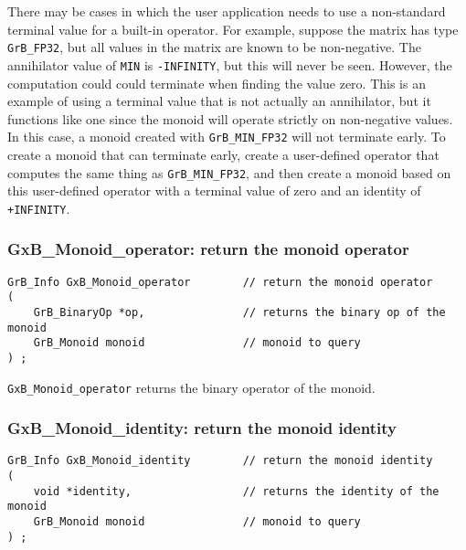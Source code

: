 \documentclass[12pt]{article}
\begin{document}
There may be cases in which the user application needs to use a non-standard
terminal value for a built-in operator.  For example, suppose the matrix has
type \verb'GrB_FP32', but all values in the matrix are known to be
non-negative.  The annihilator value of \verb'MIN' is \verb'-INFINITY', but
this will never be seen.  However, the computation could could terminate when
finding the value zero.  This is an example of using a terminal value that is
not actually an annihilator, but it functions like one since the monoid will
operate strictly on non-negative values.  In this case, a monoid created with
\verb'GrB_MIN_FP32' will not terminate early.  To create a monoid that can
terminate early, create a user-defined operator that computes the same thing as
\verb'GrB_MIN_FP32', and then create a monoid based on this user-defined
operator with a terminal value of zero and an identity of \verb'+INFINITY'.

\subsubsection{{\sf GxB\_Monoid\_operator:} return the monoid operator}
\label{monoid_operator}

\begin{mdframed}[userdefinedwidth=6in]
{\footnotesize
\begin{verbatim}
GrB_Info GxB_Monoid_operator        // return the monoid operator
(
    GrB_BinaryOp *op,               // returns the binary op of the monoid
    GrB_Monoid monoid               // monoid to query
) ;
\end{verbatim}
} \end{mdframed}

\verb'GxB_Monoid_operator' returns the binary operator of the monoid.

\subsubsection{{\sf GxB\_Monoid\_identity:} return the monoid identity}
\label{monoid_identity}

\begin{mdframed}[userdefinedwidth=6in]
{\footnotesize
\begin{verbatim}
GrB_Info GxB_Monoid_identity        // return the monoid identity
(
    void *identity,                 // returns the identity of the monoid
    GrB_Monoid monoid               // monoid to query
) ;
\end{verbatim}
} \end{mdframed}
\end{document}
